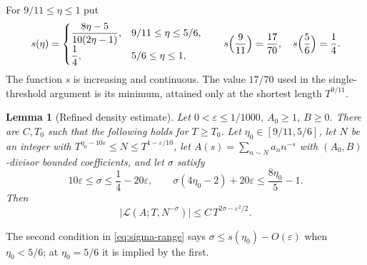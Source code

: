 \documentclass[11pt,a4paper]{amsart}
\newtheorem{lemma}[theorem]{Lemma}
\theoremstyle{definition}
\newcommand{\e}{\varepsilon}
\newcommand{\1}{\mathbf 1}
\begin{document}
For \(9/11\le\eta\le1\) put
\[
 s(\eta)=
 \begin{cases}
 \dfrac{8\eta-5}{10(2\eta-1)}, & 9/11\le\eta\le5/6,\\[2mm]
 \dfrac14, & 5/6\le\eta\le1,
 \end{cases}
 \qquad
 s\Bigl(\frac9{11}\Bigr)=\frac{17}{70},\quad s\Bigl(\frac56\Bigr)=\frac14 .
\]
The function \(s\) is increasing and continuous.  The value \(17/70\) used
in the single-threshold argument is its minimum, attained only at the
shortest length \(T^{9/11}\).

\begin{lemma}[Refined density estimate]\label{lem:refined}
Let \(0<\e\le1/1000\), \(A_0\ge1\), \(B\ge0\).  There are \(C,T_0\)
such that the following holds for \(T\ge T_0\).  Let
\(\eta_0\in[9/11,5/6]\), let \(N\) be an integer with
\(T^{\eta_0-10\e}\le N\le T^{1-\e/10}\), let \(A(s)=\sum_{n\sim N}a_nn^{-s}\)
with \((A_0,B)\)-divisor bounded coefficients, and let \(\sigma\) satisfy
\begin{equation}\label{eq:sigma-range}
 10\e\le\sigma\le\frac14-20\e,\qquad
 \sigma(4\eta_0-2)+20\e\le\frac{8\eta_0}{5}-1 .
\end{equation}
Then
\[
 \bigl|\mathcal L(A;T,N^{-\sigma})\bigr|\le C\,T^{2\sigma-\e^2/2}.
\]
\end{lemma}

The second condition in \eqref{eq:sigma-range} says
\(\sigma\le s(\eta_0)-O(\e)\) when \(\eta_0<5/6\); at \(\eta_0=5/6\) it
is implied by the first.
\end{document}
